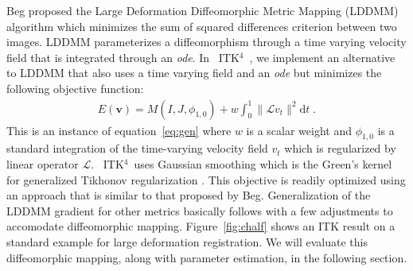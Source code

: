 \documentclass{frontiersSCNS}
\newcommand{\vect}[1]{\mathbf{#1}}
\renewcommand{\v}{\vect{v}}
\newcommand{\myphi}{\phi}
\newcommand{\dd}{\text{d}}
\newcommand{\myE}{E}
\newcommand{\opL}{\mathcal{L}}
\newcommand{\tk}{~ITK$^{\text{4}}$~}
\begin{document}
Beg proposed the Large Deformation Diffeomorphic Metric Mapping
(LDDMM) algorithm \cite{Miller2005} which minimizes the sum of squared differences
criterion between two images.  LDDMM parameterizes a
diffeomorphism through a time varying velocity field that is
integrated through an {\em ode}.  In \tk, we implement an alternative
to LDDMM that also uses a time varying field and an {\em ode} but minimizes
the following objective function:
\begin{align}
\myE(\v) = M(I,J,\myphi_{1,0})
+  w \int_{0}^{1} \| \opL v_t\|^2 \dd t \;.
\label{eq:lddmm}
\end{align}
This is an instance of equation~\ref{eq:gen} where $w$ is a scalar
weight and $\myphi_{1,0}$ is a standard integration of the
time-varying velocity field $v_t$ which is regularized by linear
operator $\opL$.  \tk uses Gaussian smoothing which is the Green's
kernel for generalized Tikhonov regularization \cite{Nielsen1997}.
This objective is readily optimized using an approach that is similar
to that proposed by Beg.  Generalization of the LDDMM gradient 
for other metrics basically follows \cite{hermosillo} with a few
adjustments to accomodate diffeomorphic mapping.
Figure~\ref{fig:chalf} shows an ITK result on a standard example for large
deformation registration.  We will evaluate this diffeomorphic
mapping, along with parameter estimation, in the following section.
\end{document}
